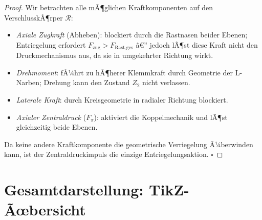 ﻿\documentclass[12pt, a4paper]{article}
\theoremstyle{remark}
\newcommand{\Ring}{\mathcal{R}}
\begin{document}
\begin{proof}
  Wir betrachten alle mÃ¶glichen Kraftkomponenten auf den VerschlusskÃ¶rper $\Ring$:
  \begin{itemize}
    \item \textit{Axiale Zugkraft} (Abheben): blockiert durch die Rastnasen beider Ebenen;
          Entriegelung erfordert $F_{\text{zug}} > F_{\text{Rast,ges}}$ â€” jedoch lÃ¶st diese
          Kraft nicht den Druckmechanismus aus, da sie in umgekehrter Richtung wirkt.
    \item \textit{Drehmoment}: fÃ¼hrt zu hÃ¶herer Klemmkraft durch Geometrie der L-Narben;
          Drehung kann den Zustand $Z_2$ nicht verlassen.
    \item \textit{Laterale Kraft}: durch Kreisgeometrie in radialer Richtung blockiert.
    \item \textit{Axialer Zentraldruck} ($F_\pi$): aktiviert die Koppelmechanik und lÃ¶st
          gleichzeitig beide Ebenen.
  \end{itemize}
  Da keine andere Kraftkomponente die geometrische Verriegelung Ã¼berwinden kann, ist
  der Zentraldruckimpuls die einzige Entriegelungsaktion. $\square$
\end{proof}

\section{Gesamtdarstellung: TikZ-Ãœbersicht}
\end{document}
